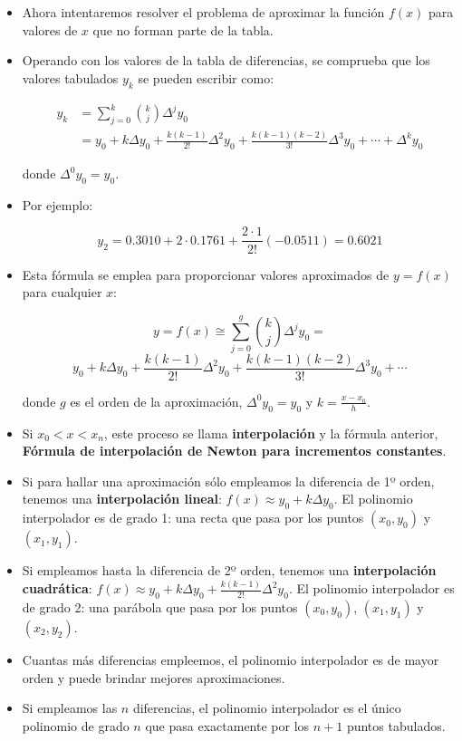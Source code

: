 \documentclass[openany]{book}
\begin{document}
\begin{itemize}
\item
  Ahora intentaremos resolver el problema de aproximar la función \(f(x)\) para valores de \(x\) que no forman parte de la tabla.
\item
  Operando con los valores de la tabla de diferencias, se comprueba que los valores tabulados \(y_k\) se pueden escribir como:

  \[
    \begin{aligned}
    y_k & = \sum_{j=0}^k \binom{k}{j} \Delta^{j} y_0 \\
        & = y_0 + k \Delta y_0 + \frac{k(k-1)}{2!}\Delta^2 y_0 + \frac{k(k-1)(k-2)}{3!}\Delta^3 y_0 + \cdots + \Delta^k y_0 
    \end{aligned}
    \]

  donde \(\Delta^{0} y_0 = y_0\).
\item
  Por ejemplo:

  \[
    y_2 = 0.3010 + 2 \cdot 0.1761 + \frac{2\cdot 1}{2!} (-0.0511) = 0.6021
    \]
\item
  Esta fórmula se emplea para proporcionar valores aproximados de \(y = f(x)\) para cualquier \(x\):

  \[
    y = f(x) \cong \sum_{j = 0}^{g} \binom{k}{j} \Delta^{j} y_0 = 
    \]
  \[
    y_0 + k \Delta y_0 + \frac{k(k-1)}{2!}\Delta^2 y_0 + \frac{k(k-1)(k-2)}{3!}\Delta^3 y_0 + \cdots
    \]

  donde \(g\) es el orden de la aproximación, \(\Delta^{0} y_0 = y_0\) y \(k = \frac{x-x_0}{h}\).
\item
  Si \(x_0 < x < x_n\), este proceso se llama \textbf{interpolación} y la fórmula anterior, \textbf{Fórmula de interpolación de Newton para incrementos constantes}.
\item
  Si para hallar una aproximación sólo empleamos la diferencia de 1º orden, tenemos una \textbf{interpolación lineal}: \(f(x) \approx y_0 + k \Delta y_0\). El polinomio interpolador es de grado 1: una recta que pasa por los puntos \((x_0, y_0)\) y \((x_1, y_1)\).
\item
  Si empleamos hasta la diferencia de 2º orden, tenemos una \textbf{interpolación cuadrática}: \(f(x) \approx y_0 + k \Delta y_0 + \frac{k(k-1)}{2!}\Delta^2 y_0\). El polinomio interpolador es de grado 2: una parábola que pasa por los puntos \((x_0, y_0)\), \((x_1, y_1)\) y \((x_2, y_2)\).
\item
  Cuantas más diferencias empleemos, el polinomio interpolador es de mayor orden y puede brindar mejores aproximaciones.
\item
  Si empleamos las \(n\) diferencias, el polinomio interpolador es el único polinomio de grado \(n\) que pasa exactamente por los \(n + 1\) puntos tabulados.
\end{itemize}
\end{document}
